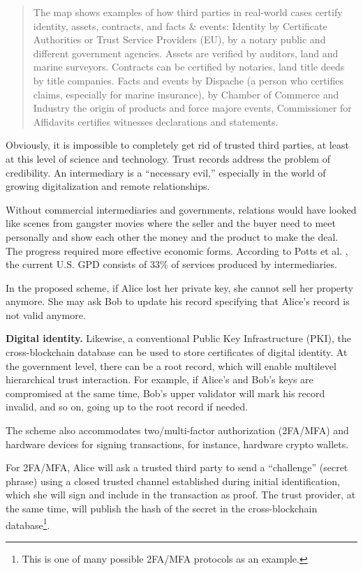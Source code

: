 \begin{multicols}{2}
\begin{quote}
The map shows examples of how third parties in real-world cases certify identity, assets, contracts, and facts \& events: Identity by Certificate Authorities or Trust Service Providers (EU), by a notary public and different government agencies. Assets are verified by auditors, land and marine surveyors. Contracts can be certified by notaries, land title deeds by title companies. Facts and events by Dispache (a person who certifies claims, especially for marine insurance), by Chamber of Commerce and Industry the origin of products and force majore events, Commissioner for Affidavits certifies witnesses declarations and statements. 
\end{quote}

Obviously, it is impossible to completely get rid of trusted third parties, at least at this level of science and technology. Trust records address the problem of credibility. An intermediary is a “necessary evil,” especially in the world of growing digitalization and remote relationships.

Without commercial intermediaries and governments, relations would have looked like scenes from gangster movies where the seller and the buyer need to meet personally and show each other the money and the product to make the deal. The progress required more effective economic forms. According to Potts et al. \cite{art1-key42}, the current U.S. GPD consists of 33\% of services produced by intermediaries.

In the proposed scheme, if Alice lost her private key, she cannot sell her property anymore. She may ask Bob to update his record specifying that Alice’s record is not valid anymore.

\textbf{Digital identity.} Likewise, a conventional Public Key Infrastructure (PKI), the cross-blockchain database can be used to store certificates of digital identity. At the government level, there can be a root record, which will enable multilevel hierarchical trust interaction. For example, if Alice’s and Bob’s keys are compromised at the same time, Bob’s upper validator will mark his record invalid, and so on, going up to the root record if needed.

The scheme also accommodates two/multi-factor authorization (2FA/MFA) and hardware devices for signing transactions, for instance, hardware crypto wallets.

For 2FA/MFA, Alice will ask a trusted third party to send a “challenge” (secret phrase) using a closed trusted channel established during initial identification, which she will sign and include in the transaction as proof. The trust provider, at the same time, will publish the hash of the secret in the cross-blockchain database\footnote{This is one of many possible 2FA/MFA protocols as an example.}.


\end{multicols}
